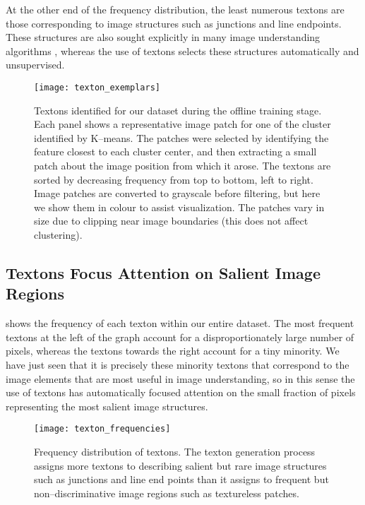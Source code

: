 At the other end of the frequency distribution, the least numerous
textons are those corresponding to image structures such as
junctions and line endpoints. These structures are also sought
explicitly in many image understanding algorithms \cite{Forsyth02},
whereas the use of textons selects these structures automatically and
unsupervised.

\begin{figure}[htp]
  \centering
  \texttt{[image: texton\_exemplars]}
  \caption{Textons identified for our dataset during the offline
    training stage. Each panel shows a representative image patch for
    one of the cluster identified by K--means. The patches were
    selected by identifying the feature closest to each cluster
    center, and then extracting a small patch about the image position
    from which it arose. The textons are sorted by
    decreasing frequency from top to bottom, left to right. Image
    patches are converted to grayscale before filtering, but here we
    show them in colour to assist visualization. The patches vary in
    size due to clipping near image boundaries (this does not affect
    clustering).
  }
  \label{fig:textons-generated}
\end{figure}

\subsection{Textons Focus Attention on Salient Image Regions}
 shows the frequency of each texton within
our entire dataset. The most frequent textons at the left of the graph
account for a disproportionately large number of pixels, whereas the
textons towards the right account for a tiny minority. We have just
seen that it is precisely these minority textons that correspond to
the image elements that are most useful in image understanding, so in
this sense the use of textons has automatically focused attention on
the small fraction of pixels representing the most salient image
structures.

\begin{figure}[htp]
  \centering
  \texttt{[image: texton\_frequencies]}
  \caption{Frequency distribution of textons. The texton generation
    process assigns more textons to describing salient but rare image
    structures such as junctions and line end points than it assigns to
    frequent but non--discriminative image regions such as textureless
    patches.}
  \label{fig:texton-freq-distr}
\end{figure}

